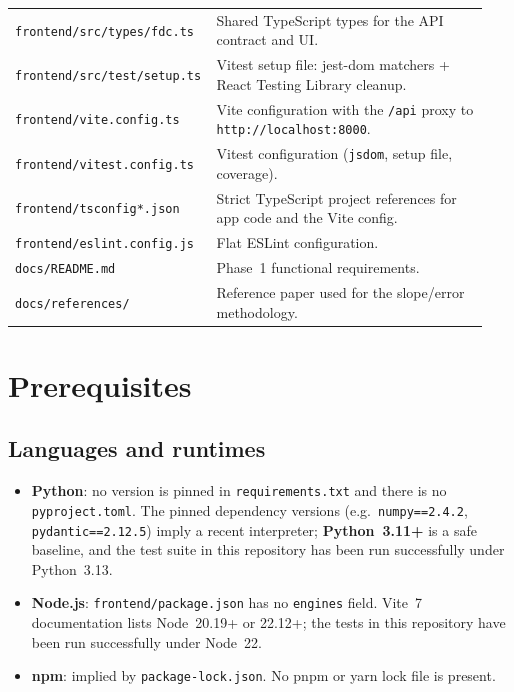 \documentclass[11pt,a4paper]{article}
\begin{document}
\begin{longtable}{@{}p{0.36\linewidth} p{0.58\linewidth}@{}}
\texttt{frontend/src/types/fdc.ts} &
Shared TypeScript types for the API contract and UI. \\
\texttt{frontend/src/test/setup.ts} &
Vitest setup file: jest-dom matchers + React Testing Library cleanup. \\
\texttt{frontend/vite.config.ts} &
Vite configuration with the \texttt{/api} proxy to
\texttt{http://localhost:8000}. \\
\texttt{frontend/vitest.config.ts} &
Vitest configuration (\texttt{jsdom}, setup file, coverage). \\
\texttt{frontend/tsconfig*.json} &
Strict TypeScript project references for app code and the Vite config. \\
\texttt{frontend/eslint.config.js} &
Flat ESLint configuration. \\
\texttt{docs/README.md} &
Phase~1 functional requirements. \\
\texttt{docs/references/} &
Reference paper used for the slope/error methodology. \\
\bottomrule
\end{longtable}

\section{Prerequisites}
\label{sec:prereq}

\subsection{Languages and runtimes}
\begin{itemize}[leftmargin=1.2em]
  \item \textbf{Python}: no version is pinned in \texttt{requirements.txt} and
        there is no \texttt{pyproject.toml}. The pinned dependency versions
        (e.g.\ \texttt{numpy==2.4.2}, \texttt{pydantic==2.12.5}) imply a recent
        interpreter; \textbf{Python~3.11+} is a safe baseline, and the test
        suite in this repository has been run successfully under Python~3.13.
  \item \textbf{Node.js}: \texttt{frontend/package.json} has no \texttt{engines}
        field. Vite~7 documentation lists Node~20.19+ or 22.12+; the tests in
        this repository have been run successfully under Node~22.
  \item \textbf{npm}: implied by \texttt{package-lock.json}. No pnpm or yarn
        lock file is present.
\end{itemize}
\end{document}
